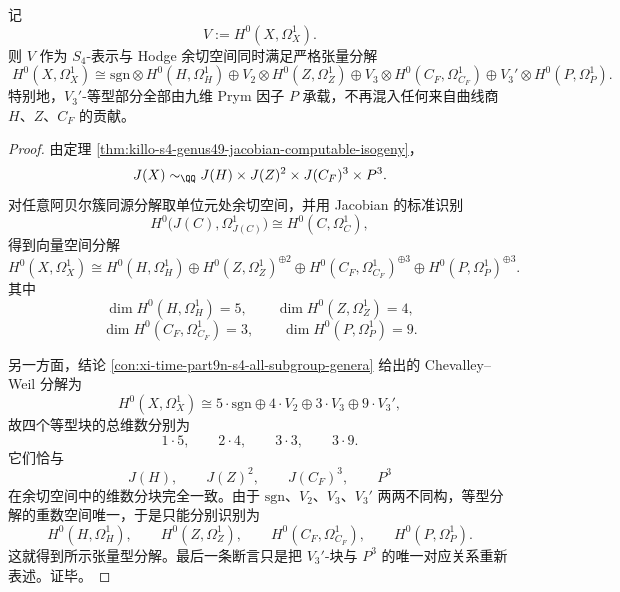 \begin{conclusion}\label{con:xi-time-part9n-s4-hodge-tensor-factorization}
记
\[
V:=H^0(X,\Omega_X^1).
\]
则 \(V\) 作为 \(S_4\)-表示与 Hodge 余切空间同时满足严格张量分解
\[
\boxed{\;
H^0(X,\Omega_X^1)
\cong
\mathrm{sgn}\otimes H^0(H,\Omega_H^1)
\oplus
V_2\otimes H^0(Z,\Omega_Z^1)
\oplus
V_3\otimes H^0(C_F,\Omega_{C_F}^1)
\oplus
V_3'\otimes H^0(P,\Omega_P^1).
\;}
\]
特别地，\(V_3'\)-等型部分全部由九维 Prym 因子 \(P\) 承载，不再混入任何来自曲线商 \(H\)、\(Z\)、\(C_F\) 的贡献。
\end{conclusion}
\begin{proof}
由定理 \ref{thm:killo-s4-genus49-jacobian-computable-isogeny}，
\[
J(X)\sim_{\QQ}J(H)\times J(Z)^2\times J(C_F)^3\times P^3.
\]
对任意阿贝尔簇同源分解取单位元处余切空间，并用 Jacobian 的标准识别
\[
H^0\!\bigl(J(C),\Omega_{J(C)}^1\bigr)\cong H^0(C,\Omega_C^1),
\]
得到向量空间分解
\[
H^0(X,\Omega_X^1)
\cong
H^0(H,\Omega_H^1)
\oplus
H^0(Z,\Omega_Z^1)^{\oplus 2}
\oplus
H^0(C_F,\Omega_{C_F}^1)^{\oplus 3}
\oplus
H^0(P,\Omega_P^1)^{\oplus 3}.
\]
其中
\[
\dim H^0(H,\Omega_H^1)=5,\qquad
\dim H^0(Z,\Omega_Z^1)=4,
\]
\[
\dim H^0(C_F,\Omega_{C_F}^1)=3,\qquad
\dim H^0(P,\Omega_P^1)=9.
\]

另一方面，结论 \ref{con:xi-time-part9n-s4-all-subgroup-genera} 给出的 Chevalley--Weil 分解为
\[
H^0(X,\Omega_X^1)
\cong
5\cdot \mathrm{sgn}\oplus 4\cdot V_2\oplus 3\cdot V_3\oplus 9\cdot V_3',
\]
故四个等型块的总维数分别为
\[
1\cdot 5,\qquad 2\cdot 4,\qquad 3\cdot 3,\qquad 3\cdot 9.
\]
它们恰与
\[
J(H),\qquad J(Z)^2,\qquad J(C_F)^3,\qquad P^3
\]
在余切空间中的维数分块完全一致。由于 \(\mathrm{sgn}\)、\(V_2\)、\(V_3\)、\(V_3'\) 两两不同构，等型分解的重数空间唯一，于是只能分别识别为
\[
H^0(H,\Omega_H^1),\qquad
H^0(Z,\Omega_Z^1),\qquad
H^0(C_F,\Omega_{C_F}^1),\qquad
H^0(P,\Omega_P^1).
\]
这就得到所示张量型分解。最后一条断言只是把 \(V_3'\)-块与 \(P^3\) 的唯一对应关系重新表述。证毕。
\end{proof}

